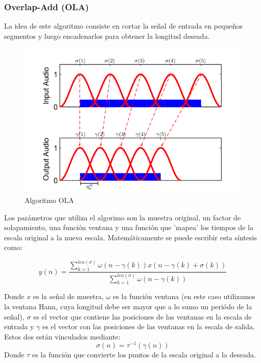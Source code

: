 \documentclass[assd_tp2_main.tex]{subfiles}
\begin{document}
\subsubsection{Overlap-Add (OLA)}

La idea de este algoritmo consiste en cortar la señal de entrada en pequeños segmentos y luego encadenarlos para obtener la longitud deseada.

\begin{figure}[H]	
	\centering
	\includegraphics[scale=0.75]{graficos/EJ6/OLA.png}
	\caption{Algoritmo OLA}
\end{figure}

Los parámetros que utiliza el algorimo son la muestra original, un factor de solapamiento, una función ventana y una función que 'mapea' los tiempos de la escala original a la nueva escala. Matemáticamente se puede escribir esta síntesis como:

\begin{equation}
y(n)=\frac{\sum_{k=1}^{len(\sigma)} \omega(n - \gamma (k)) x(n-\gamma (k) + \sigma (k))}{\sum_{k=1}^{len(\sigma)}\omega(n - \gamma (k))}
\end{equation}

Donde $x$ es la señal de muestra, $\omega$ es la función ventana  (en este caso utilizamos la ventana Hann, cuya longitud debe ser mayor que a lo sumo un periódo de la señal),  $\sigma$ es el vector que contiene las posiciones de las ventanas en la escala de entrada y $\gamma$ es el vector con las posiciones de las ventanas en la escala de salida. Estos dos están vinculados mediante:
\begin{equation}
\sigma(n)= \tau^{-1}\left(\gamma(n)\right)
\end{equation}
Donde $\tau$ es la función que convierte los puntos de la escala original a la deseada.
\end{document}
